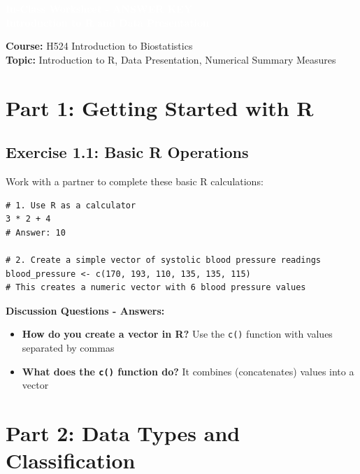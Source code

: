 \documentclass[11pt]{article}
\title{}
\author{}
\date{}
\begin{document}
\begin{tcolorbox}[colback=osaorange,colframe=black,boxrule=2pt,arc=0pt,left=6pt,right=6pt,top=10pt,bottom=10pt]
\centering
\textcolor{white}{\textbf{\Large In-Class Worksheet - ANSWER KEY}}\\
\textcolor{white}{\textbf{\large Introduction to R and Data Presentation}}
\end{tcolorbox}

\vspace{8pt}

\noindent\textbf{Course:} H524 Introduction to Biostatistics\\
\textbf{Topic:} Introduction to R, Data Presentation, Numerical Summary Measures

\vspace{8pt}

\section{Part 1: Getting Started with R}

\subsection{Exercise 1.1: Basic R Operations}
Work with a partner to complete these basic R calculations:

\begin{lstlisting}
# 1. Use R as a calculator
3 * 2 + 4
# Answer: 10

# 2. Create a simple vector of systolic blood pressure readings
blood_pressure <- c(170, 193, 110, 135, 135, 115)
# This creates a numeric vector with 6 blood pressure values
\end{lstlisting}

\textbf{Discussion Questions - Answers:}
\begin{itemize}
\item \textcolor{answergreen}{\textbf{How do you create a vector in R?}} Use the \texttt{c()} function with values separated by commas
\item \textcolor{answergreen}{\textbf{What does the \texttt{c()} function do?}} It combines (concatenates) values into a vector
\end{itemize}

\section{Part 2: Data Types and Classification}
\end{document}
